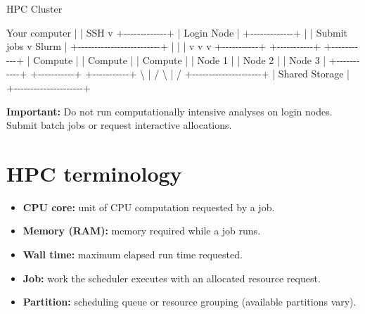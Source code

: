 \documentclass[
]{book}
\newenvironment{Shaded}{\begin{snugshade}}{\end{snugshade}}
\newcommand{\NormalTok}[1]{#1}
\providecommand{\tightlist}{%
  \setlength{\itemsep}{0pt}\setlength{\parskip}{0pt}}
\begin{document}
\begin{Shaded}
\begin{Highlighting}[]
\NormalTok{                       HPC Cluster}

\NormalTok{Your computer}
\NormalTok{     |}
\NormalTok{     | SSH}
\NormalTok{     v}
\NormalTok{+{-}{-}{-}{-}{-}{-}{-}{-}{-}{-}{-}{-}{-}+}
\NormalTok{| Login Node  |}
\NormalTok{+{-}{-}{-}{-}{-}{-}{-}{-}{-}{-}{-}{-}{-}+}
\NormalTok{      |}
\NormalTok{      | Submit jobs}
\NormalTok{      v}
\NormalTok{    Slurm}
\NormalTok{      |}
\NormalTok{      +{-}{-}{-}{-}{-}{-}{-}{-}{-}{-}{-}{-}{-}{-}{-}{-}{-}{-}{-}{-}{-}{-}{-}{-}{-}+}
\NormalTok{      |            |            |}
\NormalTok{      v            v            v}
\NormalTok{+{-}{-}{-}{-}{-}{-}{-}{-}{-}{-}{-}+ +{-}{-}{-}{-}{-}{-}{-}{-}{-}{-}{-}+ +{-}{-}{-}{-}{-}{-}{-}{-}{-}{-}{-}+}
\NormalTok{| Compute   | | Compute   | | Compute   |}
\NormalTok{| Node 1    | | Node 2    | | Node 3    |}
\NormalTok{+{-}{-}{-}{-}{-}{-}{-}{-}{-}{-}{-}+ +{-}{-}{-}{-}{-}{-}{-}{-}{-}{-}{-}+ +{-}{-}{-}{-}{-}{-}{-}{-}{-}{-}{-}+}
\NormalTok{      \textbackslash{}            |            /}
\NormalTok{       \textbackslash{}           |           /}
\NormalTok{        +{-}{-}{-}{-}{-}{-}{-}{-}{-}{-}{-}{-}{-}{-}{-}{-}{-}{-}{-}{-}{-}+}
\NormalTok{        |   Shared Storage    |}
\NormalTok{        +{-}{-}{-}{-}{-}{-}{-}{-}{-}{-}{-}{-}{-}{-}{-}{-}{-}{-}{-}{-}{-}+}
\end{Highlighting}
\end{Shaded}

\textbf{Important:} Do not run computationally intensive analyses on login nodes. Submit batch jobs or request interactive allocations.

\section{HPC terminology}\label{hpc-terminology}

\begin{itemize}
\tightlist
\item
  \textbf{CPU core:} unit of CPU computation requested by a job.
\item
  \textbf{Memory (RAM):} memory required while a job runs.
\item
  \textbf{Wall time:} maximum elapsed run time requested.
\item
  \textbf{Job:} work the scheduler executes with an allocated resource request.
\item
  \textbf{Partition:} scheduling queue or resource grouping (available partitions vary).
\end{itemize}
\end{document}
